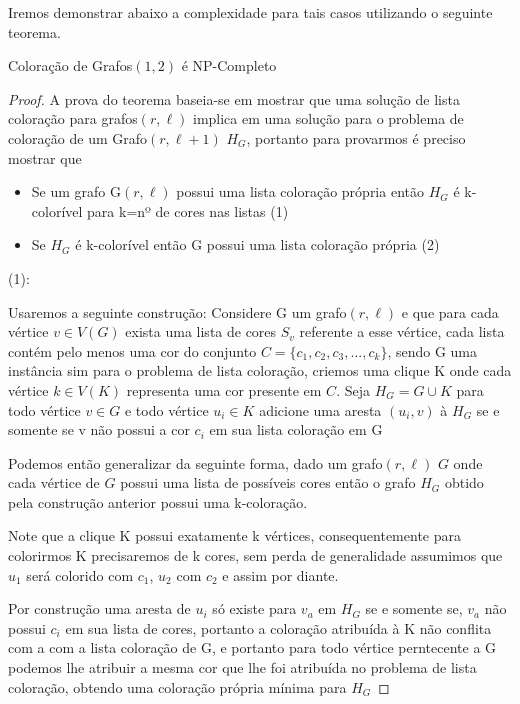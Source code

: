 Iremos demonstrar abaixo a complexidade para tais casos utilizando o seguinte teorema. 
    \begin{teorema}
      Coloração de Grafos$(1,2)$ é NP-Completo
    \end{teorema}
    \begin{proof}
      A prova do teorema baseia-se em mostrar que uma solução de lista coloração para grafos$(r,\ell)$ implica em uma solução para o problema de coloração de um Grafo$(r,\ell+1)$ $H_G$, portanto para provarmos é preciso mostrar que
      \begin{itemize}
        \item Se um grafo G$(r,\ell)$ possui uma lista coloração própria então $H_G$ é k-colorível para k=nº de cores nas listas (1)
        \item Se $H_G$ é k-colorível então G possui uma lista coloração própria (2)
      \end{itemize}
      (1):\newline
      
      Usaremos a seguinte construção:\newline
      Considere G um grafo$(r,\ell)$ e que para cada vértice $v \in V(G)$ exista uma lista de cores $S_v$ referente a esse vértice, cada lista contém pelo menos uma cor do conjunto $C = \{c_1,c_2,c_3,...,c_k \}$, sendo G uma instância sim para o problema de lista coloração, criemos uma clique K onde cada vértice $k \in V(K)$ representa uma cor presente em $C$. Seja $H_G = G \cup K$ para todo vértice $v \in G$ e todo vértice $u_i \in K$ adicione uma aresta $(u_i,v)$ à $H_G$ se e somente se v não possui a cor $c_i$ em sua lista coloração em G
      
      Podemos então generalizar da seguinte forma, dado um grafo$(r,\ell)$ $G$ onde cada vértice de $G$ possui uma lista de possíveis cores então o grafo $H_G$ obtido pela construção anterior possui uma k-coloração.
      
      Note que a clique K possui exatamente k vértices, consequentemente para colorirmos K precisaremos de k cores, sem perda de generalidade assumimos que $u_1$ será colorido com $c_1$, $u_2$ com $c_2$ e assim por diante.
      
      Por construção uma aresta de $u_i$ só existe para $v_a$ em $H_G$ se e somente se, $v_a$ não possui $c_i$ em sua lista de cores, portanto a coloração atribuída à K não conflita com a com a lista coloração de G, e portanto para todo vértice perntecente a G podemos lhe atribuir a mesma cor que lhe foi atribuída no problema de lista coloração, obtendo uma coloração própria mínima para $H_G$
      

\end{proof}
